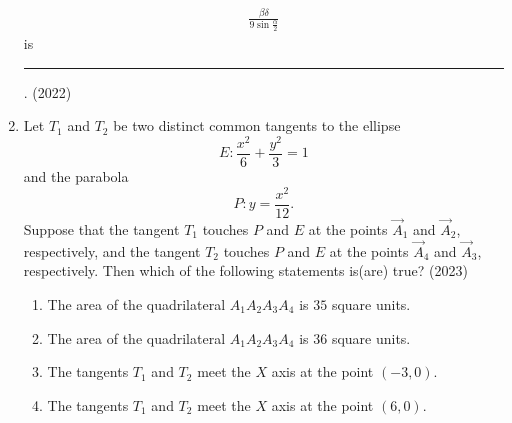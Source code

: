 \begin{enumerate}[label=\thesubsection.\arabic*.,ref=\thesubsection.\theenumi]
\begin{align*}
\frac{\beta \delta}{9 \sin \frac{\alpha}{2}}
		\end{align*}
is \rule{1cm}{0.1pt}.
\hfill (2022)     
 \item Let $T_1$ and $T_2$ be two distinct common tangents to the ellipse $$E: \frac{x^2}{6} + \frac{y^2}{3} = 1 $$ and the parabola $$P: y = \frac{x^2}{12}.$$ Suppose that the tangent $T_1$ touches $P$ and $E$ at the points $\vec{A}_1$ and $\vec{A}_2$, respectively, and the tangent $T_2$ touches $P$ and $E$ at the points $\vec{A}_4$ and $\vec{A}_3$, respectively. Then which of the following statements is(are) true?
\hfill (2023)
\begin{enumerate}
 \item The area of the quadrilateral ${A}_1{A}_2{A}_3{A}_4$ is $35$ square units.  
 \item The area of the quadrilateral ${A}_1{A}_2{A}_3{A}_4$ is $36$ square units.  
 \item The tangents $T_1$ and $T_2$ meet the $X$ axis at the point $(-3,0)$.  
 \item The tangents $T_1$ and $T_2$ meet the $X$ axis at the point $(6,0)$.  
\end{enumerate}
\end{enumerate}
